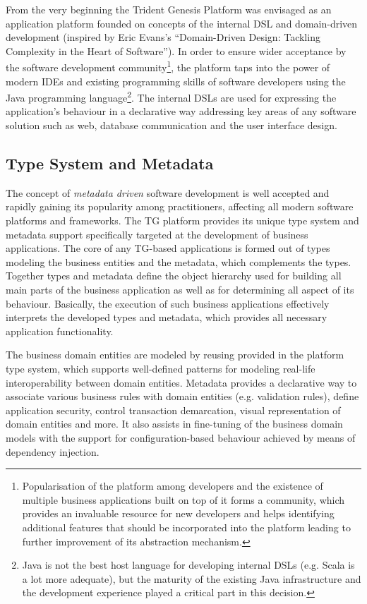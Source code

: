   From the very beginning the Trident Genesis Platform was envisaged as an application platform founded on concepts of the internal DSL and domain-driven development (inspired by Eric Evans's ``Domain-Driven Design: Tackling Complexity in the Heart of Software'').
  In order to ensure wider acceptance by the software development community\footnote{Popularisation of the platform among developers and the existence of multiple business applications built on top of it forms a community, which provides an invaluable resource for new developers and helps identifying additional features that should be incorporated into the platform leading to further improvement of its abstraction mechanism.}, the platform taps into the power of modern IDEs and existing programming skills of software developers using the Java programming language\footnote{Java is not the best host language for developing internal DSLs (e.g. Scala is a lot more adequate), but the maturity of the existing Java infrastructure and the development experience played a critical part in this decision.}.
  The internal DSLs are used for expressing the application's behaviour in a declarative way addressing key areas of any software solution such as web, database communication and the user interface design.

\subsection{Type System and Metadata}
  The concept of \emph{metadata driven} software development is well accepted and rapidly gaining its popularity among practitioners, affecting all modern software platforms and frameworks.
  The TG platform provides its unique type system and metadata support specifically targeted at the development of business applications.
  The core of any TG-based applications is formed out of types modeling the business entities and the metadata, which complements the types.
  Together types and metadata define the object hierarchy used for building all main parts of the business application as well as for determining all aspect of its behaviour.
  Basically, the execution of such business applications effectively interprets the developed types and metadata, which provides all necessary application functionality.

  The business domain entities are modeled by reusing provided in the platform type system, which supports well-defined patterns for modeling real-life interoperability between domain entities.  
  Metadata provides a declarative way to associate various business rules with domain entities (e.g. validation rules), define application security, control transaction demarcation, visual representation of domain entities and more.
  It also assists in fine-tuning of the business domain models with the support for configuration-based behaviour achieved by means of dependency injection.
  

